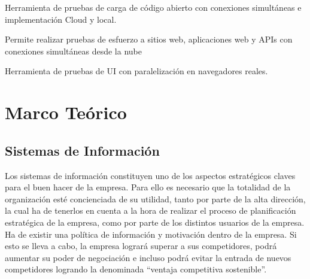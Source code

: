 \documentclass[10pt]{article}
\begin{document}
\par\vspace{\baselineskip}
\justify
\cite{IEEEreferencias:Ref2} Herramienta de pruebas de carga de código abierto con conexiones simultáneas e implementación Cloud y local.

\par\vspace{\baselineskip}
\justify
\cite{IEEEreferencias:Ref3} Permite realizar pruebas de esfuerzo a sitios web, aplicaciones web y APIs con conexiones simultáneas desde la nube

\par\vspace{\baselineskip}
\justify
\cite{IEEEreferencias:Ref4} Herramienta de pruebas de UI con paralelización en navegadores reales.

\section{Marco Teórico}
\subsection{Sistemas de Información}
\par\vspace{\baselineskip}
\justify
\cite{IEEEreferencias:Ref5} Los sistemas de información constituyen uno de los aspectos estratégicos claves para el buen hacer de la empresa. Para ello es necesario que la totalidad de la organización esté concienciada de su utilidad, tanto por parte de la alta dirección, la cual ha de tenerlos en cuenta a la hora de realizar el proceso de planificación estratégica de la empresa, como por parte de los distintos usuarios de la empresa. Ha de existir una política de información y motivación dentro de la empresa. Si esto se lleva a cabo, la empresa logrará superar a sus competidores, podrá aumentar su poder de negociación e incluso podrá evitar la entrada de nuevos competidores logrando la denominada “ventaja competitiva sostenible”. \par\vspace{\baselineskip}
\end{document}
